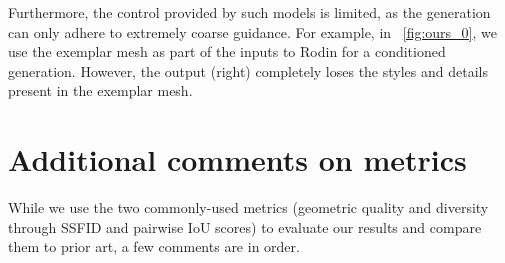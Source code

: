 Furthermore, the control provided by such models is limited, as the generation can only adhere to extremely coarse guidance. For example, in ~\cref{fig:ours_0}, we use the exemplar mesh as part of the inputs to Rodin for a conditioned generation. However, the output (right) completely loses the styles and details present in the exemplar mesh.




\section{Additional comments on metrics}
\label{sec:add_metrics}

While we use the two commonly-used metrics (geometric quality and diversity through SSFID and pairwise IoU scores) to evaluate our results and compare them to prior art, a few comments are in order. 

